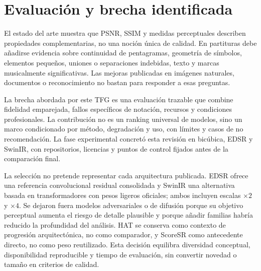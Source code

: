 \section{Evaluación y brecha identificada}
El estado del arte muestra que PSNR, SSIM y medidas perceptuales describen propiedades
complementarias, no una noción única de calidad. En partituras debe añadirse evidencia sobre
continuidad de pentagramas, geometría de símbolos, elementos pequeños, uniones o separaciones
indebidas, texto y marcas musicalmente significativas. Las mejoras publicadas en imágenes naturales,
documentos o reconocimiento no bastan para responder a esas preguntas.

La brecha abordada por este TFG es una evaluación trazable que combine fidelidad emparejada,
fallos específicos de notación, recursos y condiciones profesionales. La contribución no es un
ranking universal de modelos, sino un marco condicionado por método, degradación y uso, con límites
y casos de no recomendación. La fase experimental concretó esta revisión en bicúbica, EDSR y
SwinIR, con repositorios, licencias y puntos de control fijados antes de la comparación final.

La selección no pretende representar cada arquitectura publicada. EDSR ofrece una referencia
convolucional residual consolidada y SwinIR una alternativa basada en transformadores con pesos
ligeros oficiales; ambos incluyen escalas \(\times2\) y \(\times4\). Se dejaron fuera modelos
adversariales o de difusión porque su objetivo perceptual aumenta el riesgo de detalle plausible y
porque añadir familias habría reducido la profundidad del análisis. HAT se conserva como contexto
de progresión arquitectónica, no como comparador, y ScoreSR como antecedente directo, no como peso
reutilizado. Esta decisión equilibra diversidad conceptual, disponibilidad reproducible y tiempo de
evaluación, sin convertir novedad o tamaño en criterios de calidad.
